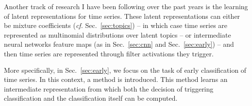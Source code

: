 Another track of research I have been following over the past years is the
learning of latent representations for time series.
These latent representations can either be mixture coefficients
(\emph{cf.} Sec.~\ref{sec:topics}) -- in which case time series are
represented as multinomial distributions over latent topics -- or intermediate
neural networks feature maps (as in Sec.~\ref{sec:cnn} and
Sec.~\ref{sec:early}) -- and then time series are represented through
filter activations they trigger.

More specifically, in Sec.~\ref{sec:early}, we focus on the task of early
classification of time series. In this context, a method is introduced.
This method
learns an intermediate representation from which both the decision of
triggering classification and the classification itself can be computed.





